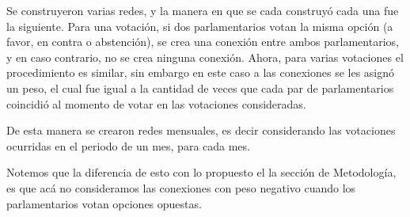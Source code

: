 \documentclass{proyectotesis}
\begin{document}
Se construyeron varias redes, y la manera en que se cada construyó cada  una fue la siguiente. Para una votación, si dos parlamentarios votan la misma opción (a favor, en contra o  abstención), se crea una conexión entre ambos parlamentarios, y en caso contrario, no se crea ninguna conexión. Ahora, para varias votaciones el procedimiento es similar, sin embargo en este caso a las conexiones se les asignó un peso, el cual fue igual a la cantidad de veces que cada par de parlamentarios coincidió al momento de votar en las votaciones consideradas.

De esta manera se crearon redes mensuales, es decir considerando las votaciones ocurridas en el periodo de un mes, para cada mes.

Notemos que la diferencia de esto con lo propuesto el la sección de Metodología, es que acá no consideramos las conexiones con peso negativo cuando los parlamentarios votan opciones opuestas.\\
\end{document}
